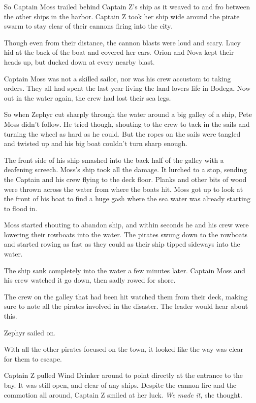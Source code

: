 \documentclass[12pt]{extbook}
\begin{document}
  So Captain Moss trailed behind Captain Z's ship as it weaved to and fro
  between the other ships in the harbor. Captain Z took her ship wide
  around the pirate swarm to stay clear of their cannons firing into the
  city.
  
  Though even from their distance, the cannon blasts were loud and scary.
  Lucy hid at the back of the boat and covered her ears. Orion and Nova
  kept their heads up, but ducked down at every nearby blast.
  
  Captain Moss was not a skilled sailor, nor was his crew accustom to
  taking orders. They all had spent the last year living the land lovers
  life in Bodega. Now out in the water again, the crew had lost their sea
  legs.
  
  So when Zephyr cut sharply through the water around a big galley of a
  ship, Pete Moss didn't follow. He tried though, shouting to the crew to
  tack in the sails and turning the wheel as hard as he could. But the
  ropes on the sails were tangled and twisted up and his big boat couldn't
  turn sharp enough.
  
  The front side of his ship smashed into the back half of the galley with
  a deafening screech. Moss's ship took all the damage. It lurched to a
  stop, sending the Captain and his crew flying to the deck floor. Planks
  and other bits of wood were thrown across the water from where the boats
  hit. Moss got up to look at the front of his boat to find a huge gash
  where the sea water was already starting to flood in.
  
  Moss started shouting to abandon ship, and within seconds he and his
  crew were lowering their rowboats into the water. The pirates swung down
  to the rowboats and started rowing as fast as they could as their ship
  tipped sideways into the water.
  
  The ship sank completely into the water a few minutes later. Captain
  Moss and his crew watched it go down, then sadly rowed for shore.
  
  The crew on the galley that had been hit watched them from their deck,
  making sure to note all the pirates involved in the disaster. The leader
  would hear about this.
  
  Zephyr sailed on.
  
  With all the other pirates focused on the town, it looked like the way
  was clear for them to escape.
  
  Captain Z pulled Wind Drinker around to point directly at the entrance
  to the bay. It was still open, and clear of any ships. Despite the
  cannon fire and the commotion all around, Captain Z smiled at her luck.
  \emph{We made it,} she thought.
  
\end{document}
